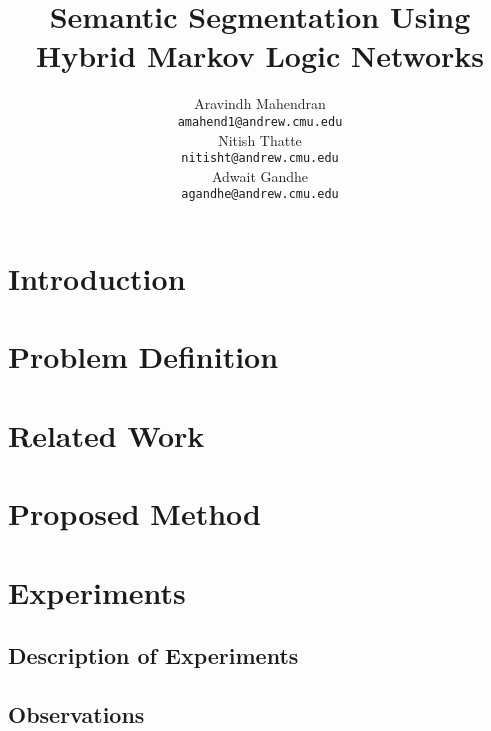 \documentclass{article} %
\title{Semantic Segmentation Using Hybrid Markov Logic Networks}
\author{
Aravindh Mahendran \\
\texttt{amahend1@andrew.cmu.edu} \\ 
\And
Nitish Thatte \\
\texttt{nitisht@andrew.cmu.edu} \\
\AND
Adwait Gandhe \\
\texttt{agandhe@andrew.cmu.edu} \\
}
\begin{document}
\maketitle

\begin{abstract}

\end{abstract}


\section{Introduction}
\label{sec:Intro}


\section{Problem Definition}
\label{sec:Problem}


\section{Related Work}
\label{sec:Related}



\section{Proposed Method}
\label{sec:Proposed}

\section{Experiments}
\label{sec:Exp}

\subsection{Description of Experiments}
\label{Description}

\subsection{Observations}
\label{Observations}
\end{document}
